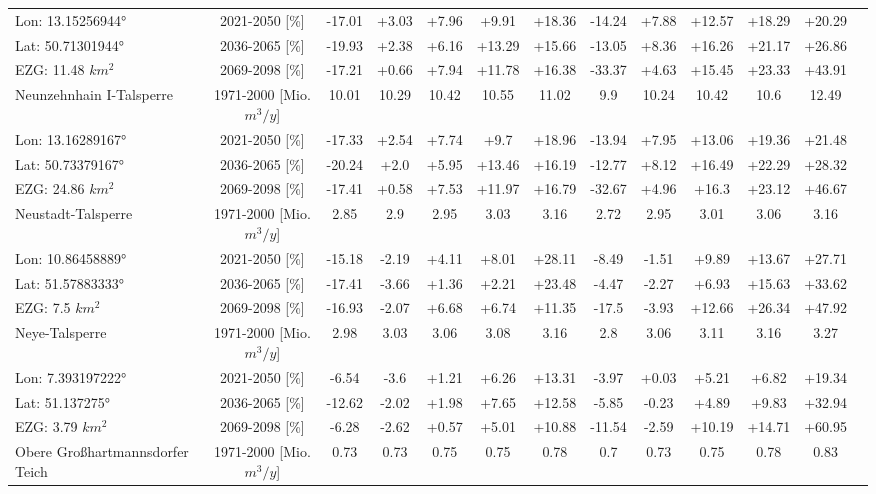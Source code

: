 \begin{longtable}{@{\extracolsep{\fill}}lc|ccccc||cccccc}
\cline{2-12} 
Lon: 13.15256944° & 2021-2050 [\%]  & -17.01 & +3.03 & +7.96 & +9.91 & +18.36 & -14.24 & +7.88 & +12.57 & +18.29 & +20.29\\ 
Lat: 50.71301944° & 2036-2065 [\%]  & -19.93 & +2.38 & +6.16 & +13.29 & +15.66 & -13.05 & +8.36 & +16.26 & +21.17 & +26.86\\ 
EZG: 11.48 $km^2$ & 2069-2098 [\%]  & -17.21 & +0.66 & +7.94 & +11.78 & +16.38 & -33.37 & +4.63 & +15.45 & +23.33 & +43.91\\ 
\hline 
Neunzehnhain I-Talsperre & 1971-2000 [Mio. $m^3/y$]  & 10.01 & 10.29 & 10.42 & 10.55 & 11.02 & 9.9 & 10.24 & 10.42 & 10.6 & 12.49\\ 
\cline{2-12} 
Lon: 13.16289167° & 2021-2050 [\%]  & -17.33 & +2.54 & +7.74 & +9.7 & +18.96 & -13.94 & +7.95 & +13.06 & +19.36 & +21.48\\ 
Lat: 50.73379167° & 2036-2065 [\%]  & -20.24 & +2.0 & +5.95 & +13.46 & +16.19 & -12.77 & +8.12 & +16.49 & +22.29 & +28.32\\ 
EZG: 24.86 $km^2$ & 2069-2098 [\%]  & -17.41 & +0.58 & +7.53 & +11.97 & +16.79 & -32.67 & +4.96 & +16.3 & +23.12 & +46.67\\ 
\hline 
Neustadt-Talsperre & 1971-2000 [Mio. $m^3/y$]  & 2.85 & 2.9 & 2.95 & 3.03 & 3.16 & 2.72 & 2.95 & 3.01 & 3.06 & 3.16\\ 
\cline{2-12} 
Lon: 10.86458889° & 2021-2050 [\%]  & -15.18 & -2.19 & +4.11 & +8.01 & +28.11 & -8.49 & -1.51 & +9.89 & +13.67 & +27.71\\ 
Lat: 51.57883333° & 2036-2065 [\%]  & -17.41 & -3.66 & +1.36 & +2.21 & +23.48 & -4.47 & -2.27 & +6.93 & +15.63 & +33.62\\ 
EZG: 7.5 $km^2$ & 2069-2098 [\%]  & -16.93 & -2.07 & +6.68 & +6.74 & +11.35 & -17.5 & -3.93 & +12.66 & +26.34 & +47.92\\ 
\hline 
Neye-Talsperre & 1971-2000 [Mio. $m^3/y$]  & 2.98 & 3.03 & 3.06 & 3.08 & 3.16 & 2.8 & 3.06 & 3.11 & 3.16 & 3.27\\ 
\cline{2-12} 
Lon: 7.393197222° & 2021-2050 [\%]  & -6.54 & -3.6 & +1.21 & +6.26 & +13.31 & -3.97 & +0.03 & +5.21 & +6.82 & +19.34\\ 
Lat: 51.137275° & 2036-2065 [\%]  & -12.62 & -2.02 & +1.98 & +7.65 & +12.58 & -5.85 & -0.23 & +4.89 & +9.83 & +32.94\\ 
EZG: 3.79 $km^2$ & 2069-2098 [\%]  & -6.28 & -2.62 & +0.57 & +5.01 & +10.88 & -11.54 & -2.59 & +10.19 & +14.71 & +60.95\\ 
\hline 
Obere Großhartmannsdorfer Teich & 1971-2000 [Mio. $m^3/y$]  & 0.73 & 0.73 & 0.75 & 0.75 & 0.78 & 0.7 & 0.73 & 0.75 & 0.78 & 0.83\\ 

\end{longtable}
